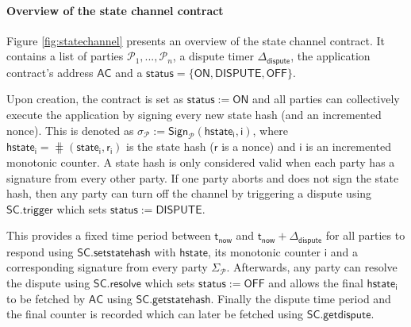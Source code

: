 \documentclass{llncs}
\newcommand{\chanstatus}{\mathsf{status}}
\newcommand{\chanon}{\mathsf{ON}}
\newcommand{\chandispute}{\mathsf{DISPUTE}}
\newcommand{\chanoff}{\mathsf{OFF}}
\newcommand{\cmd}{\mathsf{cmd}}
\newcommand{\hstate}{\mathsf{hstate}}
\newcommand{\hstatei}{\mathsf{hstate}_{\monotoniccounter}}
\newcommand{\hstateplus}{\ensuremath{\mathsf{hstate}_{\monotoniccounter+1}}}
\newcommand{\monotoniccounter}{\mathsf{i}}
\newcommand{\stateinfoi}{\mathsf{state}_{\mathsf{i}}}
\newcommand{\stateinfoplus}{\mathsf{state}_{\mathsf{i+1}}}
\newcommand{\participant}{\mathcal{P}}
\newcommand{\rani}{\mathsf{r}_{\mathsf{i}}}
\newcommand{\ran}{\mathsf{r}}
\newcommand{\statechanneldispute}{\mathsf{SC}.\mathsf{trigger}}
\newcommand{\statechannelsetstate}{\mathsf{SC}.\mathsf{setstatehash}}
\newcommand{\statechannelresolve}{\mathsf{SC}.\mathsf{resolve}}
\newcommand{\statechannelgetcommitment}{\mathsf{SC}.\mathsf{getstatehash}}
\newcommand{\statechannelgetdispute}{\mathsf{SC}.\mathsf{getdispute}}
\newcommand{\sign}{\mathsf{Sign}}
\newcommand{\appcontract}{\mathsf{AC}}
\newcommand{\timerdispute}{\mathsf{\Delta}_{\mathsf{dispute}}}
\newcommand{\timenow}{\mathsf{t}_{\mathsf{now}}}
\newcommand{\timedispute}{\timenow + \mathsf{\Delta}_{\mathsf{dispute}}}
\begin{document}
\paragraph{Overview of the state channel contract} 
Figure \ref{fig:statechannel} presents an overview of the state channel contract. 
It contains a list of parties $\participant_{1},...,\participant_{n}$, a dispute timer $\timerdispute$, the application contract's address $\appcontract$ and a  $\chanstatus = \{\chanon, \chandispute, \chanoff\}.$

Upon creation, the contract is set as $\chanstatus := \chanon$ and all parties can collectively execute the application by signing every new state hash (and an incremented nonce).
This is denoted as $\sigma_{\participant} := \sign_{\participant}(\hstatei, \monotoniccounter)$, where  $\hstatei = \hash(\stateinfoi, \rani)$ is the state hash ($\ran$ is a nonce) and $\monotoniccounter$ is an incremented monotonic counter. 
A state hash is only considered valid when each party has a signature from every other party. 
If one party aborts and does not sign the state hash, then any party can turn off the channel by triggering a dispute using $\statechanneldispute$ which sets $\chanstatus := \chandispute$. 

This provides a fixed time period between $\timenow$ and $\timedispute$ for all parties to respond using $\statechannelsetstate$ with $\hstate$, its monotonic counter $\monotoniccounter$ and a corresponding signature from every party $\Sigma_{\participant}$. 
Afterwards, any party can resolve the dispute using $\statechannelresolve$ which sets $\chanstatus := \chanoff$ and allows the final $\hstatei$ to be fetched by $\appcontract$ using  $\statechannelgetcommitment$. 
Finally the dispute time period and the final counter is recorded which can later be fetched using $\statechannelgetdispute$. 
%
%
\end{document}

